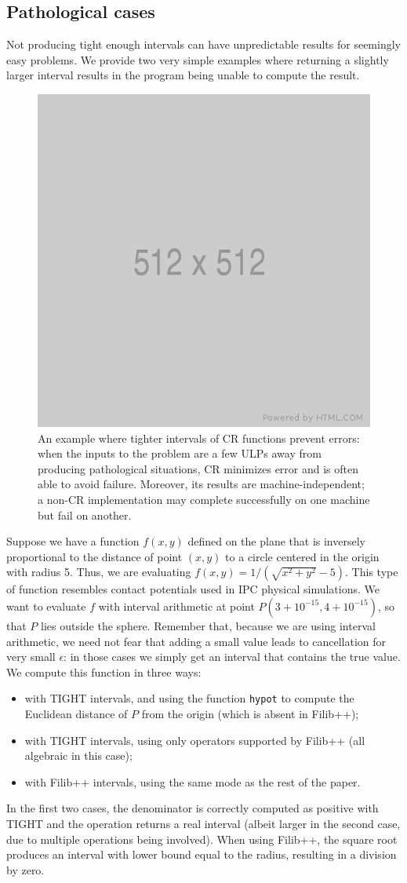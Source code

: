\subsection{Pathological cases}
Not producing tight enough intervals can have unpredictable results for seemingly easy problems. We provide two very simple examples where returning a slightly larger interval results in the program being unable to compute the result.

\begin{figure}
	\includegraphics[width=0.4\linewidth]{fig/512x512.png}
	\centering
	\caption{An example where tighter intervals of CR functions prevent errors: when the inputs to the problem are a few ULPs away from producing pathological situations, CR minimizes error and is often able to avoid failure. Moreover, its results are machine-independent; a non-CR implementation may complete successfully on one machine but fail on another.}
	\label{fig:tori}
\end{figure}
Suppose we have a function $f(x,y)$ defined on the plane that is inversely proportional to the distance of point $(x,y)$ to a circle centered in the origin with radius 5.
Thus, we are evaluating $f(x,y) = 1/(\sqrt{x^2 + y^2}-5)$.
This type of function resembles contact potentials used in IPC physical simulations.
We want to evaluate $f$ with interval arithmetic at point $P(3+10^{-15},4+10^{-15})$, so that $P$ lies outside the sphere. Remember that, because we are using interval arithmetic, we need not fear that adding a small value leads to cancellation for very small $\epsilon$: in those cases we simply get an interval that contains the true value.
We compute this function in three ways:
\begin{itemize}
	\item with TIGHT intervals, and using the function \texttt{hypot} to compute the Euclidean distance of $P$ from the origin (which is absent in Filib++);
	\item with TIGHT intervals, using only operators supported by Filib++ (all algebraic in this case);
	\item with Filib++ intervals, using the same mode as the rest of the paper.
\end{itemize}
In the first two cases, the denominator is correctly computed as positive with TIGHT and the operation returns a real interval (albeit larger in the second case, due to multiple operations being involved).
When using Filib++, the square root produces an interval with lower bound equal to the radius, resulting in a division by zero.

